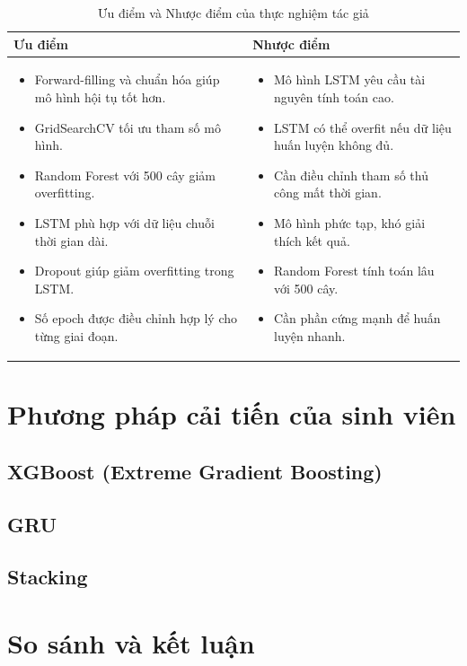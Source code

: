 \begin{table}[h]
    \centering
    \renewcommand{\arraystretch}{1} %
    \begin{tabular}{|p{7.5cm}|p{7.5cm}|}
        \hline
        \textbf{Ưu điểm} & \textbf{Nhược điểm} \\ \hline
        \begin{itemize}
            \item Forward-filling và chuẩn hóa giúp mô hình hội tụ tốt hơn.
            \item GridSearchCV tối ưu tham số mô hình.
            \item Random Forest với 500 cây giảm overfitting.
            \item LSTM phù hợp với dữ liệu chuỗi thời gian dài.
            \item Dropout giúp giảm overfitting trong LSTM.
            \item Số epoch được điều chỉnh hợp lý cho từng giai đoạn.
        \end{itemize} 
        & 
        \begin{itemize}
            \item Mô hình LSTM yêu cầu tài nguyên tính toán cao.
            \item LSTM có thể overfit nếu dữ liệu huấn luyện không đủ.
            \item Cần điều chỉnh tham số thủ công mất thời gian.
            \item Mô hình phức tạp, khó giải thích kết quả.
            \item Random Forest tính toán lâu với 500 cây.
            \item Cần phần cứng mạnh để huấn luyện nhanh.
        \end{itemize} \\ \hline
    \end{tabular}
    \caption{Ưu điểm và Nhược điểm của thực nghiệm tác giả}
    \label{tab:uudiem_hanche}
\end{table}

\section{Phương pháp cải tiến của sinh viên}
\subsection{XGBoost (Extreme Gradient Boosting)}
\subsection{GRU}
\subsection{Stacking}

\section{So sánh và kết luận}

